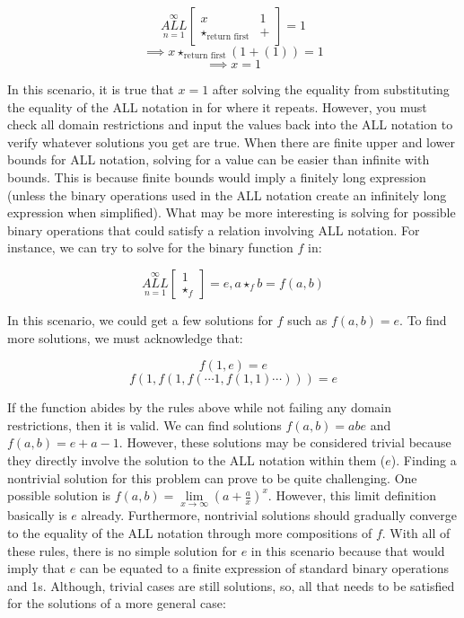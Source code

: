 \documentclass{article}
\begin{document}
$$\underset{n=1}{\overset{\infty}{ALL}} \begin{bmatrix}
x & 1 \\
\star_{ \text{return first}} & +
\end{bmatrix} = 1$$
$$\implies x \star_{\text{return first}} (1+(1)) = 1$$
$$\implies x = 1$$

In this scenario, it is true that $x=1$ after solving the equality from substituting the equality of the ALL notation in for where it repeats. However, you must check all domain restrictions and input the values back into the ALL notation to verify whatever solutions you get are true. When there are finite upper and lower bounds for ALL notation, solving for a value can be easier than infinite with bounds. This is because finite bounds would imply a finitely long expression (unless the binary operations used in the ALL notation create an infinitely long expression when simplified). What may be more interesting is solving for possible binary operations that could satisfy a relation involving ALL notation. For instance, we can try to solve for the binary function $f$ in:

$$\underset{n=1}{\overset{\infty}{ALL}} \begin{bmatrix}
1 \\
\star_f
\end{bmatrix} = e, a \star_f b = f(a,b)$$

In this scenario, we could get a few solutions for $f$ such as $f(a,b)=e$. To find more solutions, we must acknowledge that:

$$f(1,e)=e$$
$$f(1,f(1,f(\cdots 1,f(1,1) \cdots ))) = e$$

If the function abides by the rules above while not failing any domain restrictions, then it is valid. We can find solutions $f(a,b)=abe$ and $f(a,b)=e+a-1$. However, these solutions may be considered trivial because they directly involve the solution to the ALL notation within them ($e$). Finding a nontrivial solution for this problem can prove to be quite challenging. One possible solution is $f(a,b)=\underset{x \rightarrow \infty}{\lim} (a+\frac{a}{x})^x$. However, this limit definition basically is $e$ already. Furthermore, nontrivial solutions should gradually converge to the equality of the ALL notation through more compositions of $f$. With all of these rules, there is no simple solution for $e$ in this scenario because that would imply that $e$ can be equated to a finite expression of standard binary operations and 1s. Although, trivial cases are still solutions, so, all that needs to be satisfied for the solutions of a more general case:
\end{document}
